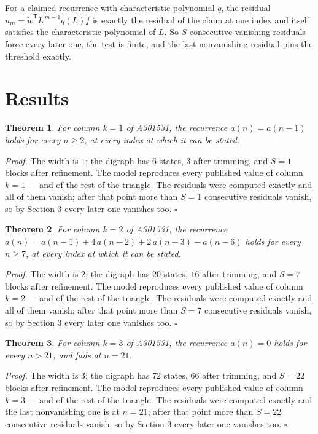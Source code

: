 \documentclass[11pt]{article}
\newtheorem{theorem}{Theorem}
\theoremstyle{definition}
\begin{document}
For a claimed recurrence with characteristic polynomial $q$, the residual $u_m = \tilde w^{\mathsf T}L^{\,m-1}q(L)\tilde f$ is exactly the residual of the claim at one index and itself satisfies the characteristic polynomial of $L$. So $S$ consecutive vanishing residuals force every later one, the test is finite, and the last nonvanishing residual pins the threshold exactly.

\section{Results}

\begin{theorem} For column $k = 1$ of A301531, the recurrence $a(n) = a(n-1)$ holds for every $n \ge 2$, at every index at which it can be stated.\end{theorem}

{\itshape Proof.} The width is $1$; the digraph has $6$ states, $3$ after trimming, and $S = 1$ blocks after refinement. The model reproduces every published value of column $k = 1$ --- and of the rest of the triangle. The residuals were computed exactly and all of them vanish; after that point more than $S = 1$ consecutive residuals vanish, so by Section 3 every later one vanishes too. $\square$

\begin{theorem} For column $k = 2$ of A301531, the recurrence $a(n) = a(n-1) + 4\,a(n-2) + 2\,a(n-3) - a(n-6)$ holds for every $n \ge 7$, at every index at which it can be stated.\end{theorem}

{\itshape Proof.} The width is $2$; the digraph has $20$ states, $16$ after trimming, and $S = 7$ blocks after refinement. The model reproduces every published value of column $k = 2$ --- and of the rest of the triangle. The residuals were computed exactly and all of them vanish; after that point more than $S = 7$ consecutive residuals vanish, so by Section 3 every later one vanishes too. $\square$

\begin{theorem} For column $k = 3$ of A301531, the recurrence $a(n) = 0$ holds for every $n > 21$, and fails at $n = 21$.\end{theorem}

{\itshape Proof.} The width is $3$; the digraph has $72$ states, $66$ after trimming, and $S = 22$ blocks after refinement. The model reproduces every published value of column $k = 3$ --- and of the rest of the triangle. The residuals were computed exactly and the last nonvanishing one is at $n = 21$; after that point more than $S = 22$ consecutive residuals vanish, so by Section 3 every later one vanishes too. $\square$
\end{document}
